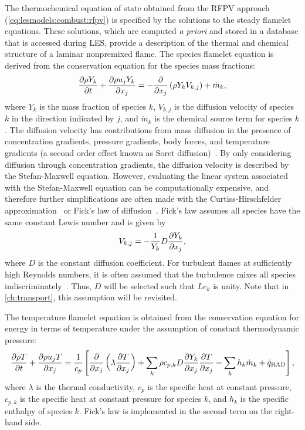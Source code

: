 The thermochemical equation of state obtained from the RFPV approach (\cref{eq:lesmodels:combust:rfpv}) is specified by the solutions to the steady flamelet equations. These solutions, which are computed \textit{a priori} and stored in a database that is accessed during LES, provide a description of the thermal and chemical structure of a laminar nonpremixed flame. The species flamelet equation is derived from the conservation equation for the species mass fractions:
\begin{equation}\label{eq:lesmodels:combust:flamelet:consy}
  \trder{Y_k} = -\pder[]{x_j}\left( \rho Y_k V_{k,j} \right) + \dot{m}_k,
\end{equation}
where $Y_k$ is the mass fraction of species $k$, $V_{k,j}$ is the diffusion velocity of species $k$ in the direction indicated by $j$, and $\dot{m}_k$ is the chemical source term for species $k$. The diffusion velocity has contributions from mass diffusion in the presence of concentration gradients, pressure gradients, body forces, and temperature gradients (a second order effect known as Soret diffusion)~\cite{law2006}. By only considering diffusion through concentration gradients, the diffusion velocity is described by the Stefan-Maxwell equation. However, evaluating the linear system associated with the Stefan-Maxwell equation can be computationally expensive, and therefore further simplifications are often made with the Curtiss-Hirschfelder approximation~\cite{curtiss1949} or Fick's law of diffusion~\cite{fick1855}. Fick's law assumes all species have the same constant Lewis number and is given by
\begin{equation}\label{eq:lesmodels:combust:flamelet:fick}
  V_{k,j} = -\frac{1}{Y_k}D\pder[Y_k]{x_j},
\end{equation}
where $D$ is the constant diffusion coefficient. For turbulent flames at sufficiently high Reynolds numbers, it is often assumed that the turbulence mixes all species indiscriminately~\cite{pitsch19981057}. Thus, $D$ will be selected such that $Le_k$ is unity. Note that in \cref{ch:transport}, this assumption will be revisited.

The temperature flamelet equation is obtained from the conservation equation for energy in terms of temperature under the assumption of constant thermodynamic pressure:
\begin{equation}\label{eq:lesmodels:combust:flamelet:const}
  \trder{T} = \frac{1}{c_p}\left[ \pder[]{x_j}\left( \lambda\pder[T]{x_j} \right) + \sum\limits_{k} \rho c_{p,k} D\pder[Y_k]{x_j}\pder[T]{x_j} - \sum\limits_{k} h_k\dot{m}_k + \dot{q}_{\text{RAD}} \right],
\end{equation}
where $\lambda$ is the thermal conductivity, $c_p$ is the specific heat at constant pressure, $c_{p,k}$ is the specific heat at constant pressure for species $k$, and $h_k$ is the specific enthalpy of species $k$. Fick's law is implemented in the second term on the right-hand side.

